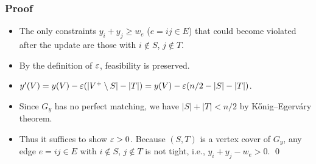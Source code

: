\documentclass[14pt,aspectratio=169,xcolor=dvipsnames,table,onlytextwidth]{beamer}
\begin{document}
\begin{frame}
    \frametitle{Proof}

    \small

    \begin{itemize}
        \item The only constraints $y_i + y_j \geq w_e$ ($e = ij \in E$) that could become violated after the update are those with $i \notin S$, $j \notin T$.
        \item By the definition of $\varepsilon$, feasibility is preserved.
    \end{itemize}

    \bigskip\pause
    \begin{itemize}
        \item $y'(V) = y(V) - \varepsilon(|V^+ \setminus S| - |T|) = y(V) - \varepsilon(n/2 - |S| - |T|)$.

        \item Since $G_y$ has no perfect matching, we have $|S| + |T| < n/2$ by K\H{o}nig--Egerv\'ary theorem.

        \item Thus it suffices to show $\varepsilon > 0$. Because $(S,T)$ is a vertex cover of $G_y$, any edge $e = ij \in E$ with $i \notin S$, $j \notin T$ is not tight, i.e., $y_i + y_j - w_e > 0$. \qed
    \end{itemize}
\end{frame}
\end{document}
